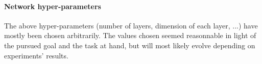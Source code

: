 \documentclass[conference]{IEEEtran}
\begin{document}
\paragraph{Network hyper-parameters}

The above hyper-parameters (number of layers, dimension of each layer, ...) have
mostly been chosen arbitrarily. The values chosen seemed reasonnable in light of
the pursued goal and the task at hand, but will most likely evolve depending on
experiments' results.

\appendix

\printbibliography
\end{document}
